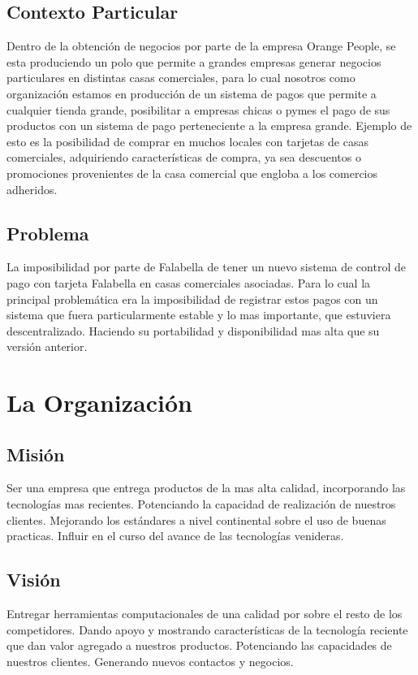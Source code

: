 \documentclass[a4paper,12pt,openany,oneside]{book}
\begin{document}
\section{Contexto Particular}
Dentro de la obtención de negocios por parte de la empresa Orange People, se esta produciendo un polo   que permite a grandes empresas generar negocios particulares en distintas casas comerciales, para lo cual nosotros como organización estamos en producción de un sistema de pagos que permite a cualquier tienda grande, posibilitar a empresas chicas o pymes el pago de sus productos con un sistema de pago perteneciente a la empresa grande.
Ejemplo de esto es la posibilidad de comprar en muchos locales con tarjetas de casas comerciales, adquiriendo características de compra, ya sea descuentos o promociones provenientes de la casa comercial que engloba a los comercios adheridos.
\section{Problema}
La imposibilidad por parte de Falabella de tener un nuevo sistema de control de pago con tarjeta Falabella en casas comerciales asociadas. Para lo cual la principal problemática era la imposibilidad de registrar estos pagos con un sistema que fuera particularmente estable y lo mas importante, que estuviera descentralizado. Haciendo su portabilidad y disponibilidad mas alta que su versión anterior.
\chapter{La Organización}
\thispagestyle{empty}
\section{Misión}
Ser una empresa que entrega productos de la mas alta calidad, incorporando las tecnologías mas recientes. Potenciando la capacidad de realización de nuestros clientes. Mejorando los estándares a nivel continental sobre el uso de buenas practicas. Influir en el curso del avance de las tecnologías venideras.
\section{Visión}
Entregar herramientas computacionales de una calidad por sobre el resto de los competidores. Dando apoyo y mostrando características de la tecnología reciente que dan valor agregado a nuestros productos. Potenciando las capacidades de nuestros clientes. Generando nuevos contactos y negocios.
\end{document}
